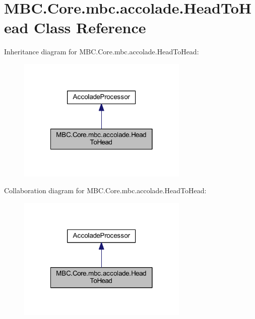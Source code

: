 \hypertarget{class_m_b_c_1_1_core_1_1mbc_1_1accolade_1_1_head_to_head}{\section{M\-B\-C.\-Core.\-mbc.\-accolade.\-Head\-To\-Head Class Reference}
\label{class_m_b_c_1_1_core_1_1mbc_1_1accolade_1_1_head_to_head}
}


Inheritance diagram for M\-B\-C.\-Core.\-mbc.\-accolade.\-Head\-To\-Head\-:
\nopagebreak
\begin{figure}[H]
\begin{center}
\leavevmode
\includegraphics[width=230pt]{class_m_b_c_1_1_core_1_1mbc_1_1accolade_1_1_head_to_head__inherit__graph}
\end{center}
\end{figure}


Collaboration diagram for M\-B\-C.\-Core.\-mbc.\-accolade.\-Head\-To\-Head\-:
\nopagebreak
\begin{figure}[H]
\begin{center}
\leavevmode
\includegraphics[width=230pt]{class_m_b_c_1_1_core_1_1mbc_1_1accolade_1_1_head_to_head__coll__graph}
\end{center}
\end{figure}
